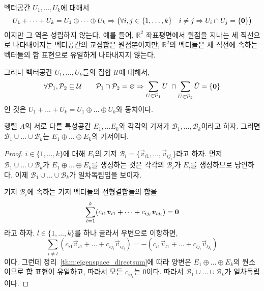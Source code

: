 \documentclass[../engineering_mathematics_lecture_note.tex]{subfiles}
\begin{document}
\begin{remark}
    벡터공간 $U_1, \dots, U_k$에 대해서
    \begin{equation*}
        U_1 + \dots + U_k = U_1 \oplus \dots \oplus U_k \Rightarrow \bigl(\forall i, j \in \{1, \dots, k\}\quad i \neq j \Rightarrow U_i \cap U_j = \{\bm{\mathrm{0}}\}\bigr)
    \end{equation*}
    이지만 그 역은 성립하지 않는다.
    예를 들어, $\mathbb R^2$ 좌표평면에서 원점을 지나는 세 직선으로 나타내어지는 벡터공간의 교집합은 원점뿐이지만, $\mathbb R^2$의 벡터들은 세 직선에 속하는 벡터들의 합 표현으로 유일하게 나타내지지 않는다.

    그러나 벡터공간 $U_1, \dots, U_k$들의 집합 $\mathcal U$에 대해서,
    \begin{equation*}
        \forall \mathcal P_1, \mathcal P_2 \subseteq \mathcal U \qquad \mathcal P_1 \cap \mathcal P_2 = \varnothing \Rightarrow \sum_{U \in \mathcal P_1} U\ \cap \sum_{\tilde U \in \mathcal P_2} \tilde U = \{\bm{\mathrm{0}}\}
    \end{equation*}
    인 것은 $U_1 + \dots + U_k = U_1 \oplus \dots \oplus U_k$와 동치이다.
\end{remark}

\begin{theorem}
    행렬 $A$의 서로 다른 특성공간 $E_1, \dots E_k$와 각각의 기저가 $\mathcal B_1, \dots, \mathcal B_k$이라고 하자.
    그러면 $\mathcal B_1 \cup \dots \cup \mathcal B_k$는 $E_1 \oplus \dots \oplus E_k$의 기저이다.
\end{theorem}

\begin{proof}
    $i \in \{1, \dots, k\}$에 대해 $E_i$의 기저 $\mathcal B_i = \{\vec v_{i1}, \dots, \vec v_{ij_i}\}$라고 하자.
    먼저 $\mathcal B_1 \cup \dots \cup \mathcal B_k$가 $E_1 \oplus \dots \oplus E_k$를 생성하는 것은 각각의 $\mathcal B_i$가 $E_i$를 생성하므로 당연하다.
    이제 $\mathcal B_1 \cup \dots \cup \mathcal B_k$가 일차독립임을 보이자.

    기저 $\mathcal B_i$에 속하는 기저 벡터들의 선형결합들의 합을
    \begin{equation*}
        \sum_{i = 1}^k (c_{i1} \bm{\mathit{v}}_{i1} + \dots + c_{ij_i} \bm{\mathit{v}}_{ij_i}) = \bm{\mathrm{0}}
    \end{equation*}
    라고 하자.
    $l \in \{1, \dots, k\}$를 하나 골라서 우변으로 이항하면,
    \begin{equation*}
        \sum_{i \neq l} (c_{i1} \vec v_{i1} + \dots + c_{ij_i} \vec v_{ij_i}) = -(c_{l1} \vec v_{l1} + \dots + c_{lj_l} \vec v_{lj_l})
    \end{equation*}
    이다.
    그런데 정리~\ref{thm:eigenspace_directsum}에 따라 양변은 $E_1 \oplus \dots \oplus E_k$의 원소이므로 합 표현이 유일하고, 따라서 모든 $c_{ij_i}$는 0이다.
    따라서 $\mathcal B_1 \cup \dots \cup \mathcal B_k$가 일차독립이다.
\end{proof}
\end{document}
